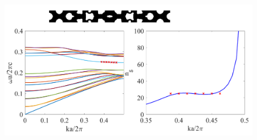 \documentclass{article}
\begin{document}
	\begin{figure}[!h]
	\def\svgwidth{1\textwidth}
	\includegraphics[width=\textwidth]{Resp_Dnum_2_FF.png} 
\end{figure}
\end{document}
